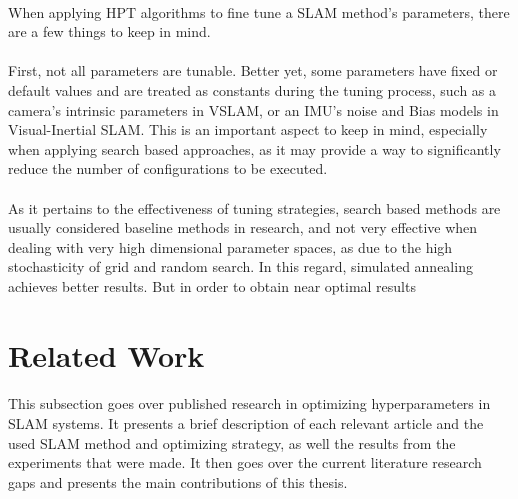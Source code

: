 \paragraph{}When applying \ac{HPT} algorithms to fine tune a SLAM method's parameters, there are a few things to keep in mind.
\paragraph{}First, not all parameters are tunable. Better yet, some parameters have fixed or default values and are treated as constants during the tuning process, such as a camera's intrinsic parameters in VSLAM, or an IMU's noise and Bias models in Visual-Inertial \ac{SLAM}. This is an important aspect to keep in mind, especially when applying search based approaches, as it may provide a way to significantly reduce the number of configurations to be executed.
\paragraph{}As it pertains to the effectiveness of tuning strategies, search based methods are usually considered baseline methods in research, and not very effective when dealing with very high dimensional parameter spaces, as due to the high stochasticity of grid and random search. In this regard, simulated annealing achieves better results. But in order to obtain near optimal results

\section{Related Work}
\paragraph{}This subsection goes over published research in optimizing hyperparameters in \ac{SLAM} systems. It presents a brief description of each relevant article and the used \ac{SLAM} method and optimizing strategy, as well the results from the experiments that were made. It then goes over the current literature research gaps and presents the main contributions of this thesis.

